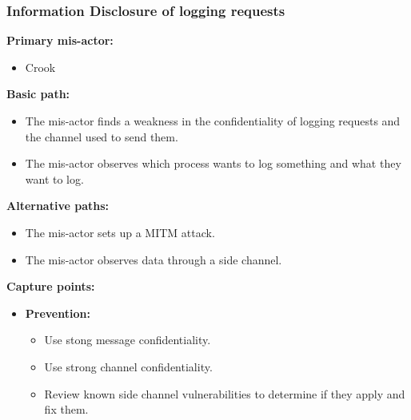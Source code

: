 \documentclass[a4paper,11pt]{report}
\begin{document}
\subsubsection{Information Disclosure of logging requests}
\label{LoggingEngineFlowCasesI}
\textbf{Primary mis-actor:}
\begin{itemize}
\item Crook
\end{itemize}
\textbf{Basic path:}
\begin{itemize}
\item The mis-actor finds a weakness in the confidentiality of logging requests and the channel used to send them.
\item The mis-actor observes which process wants to log something and what they want to log.
\end{itemize}
\textbf{Alternative paths:}
\begin{itemize}
\item The mis-actor sets up a MITM attack.
\item The mis-actor observes data through a side channel.
\end{itemize}
\textbf{Capture points:}
\begin{itemize}
\item \textbf{Prevention:}
\begin{itemize}
\item Use stong message confidentiality.
\item Use strong channel confidentiality.
\item Review known side channel vulnerabilities to determine if they apply and fix them.
\end{itemize}
\end{itemize}
\end{document}
